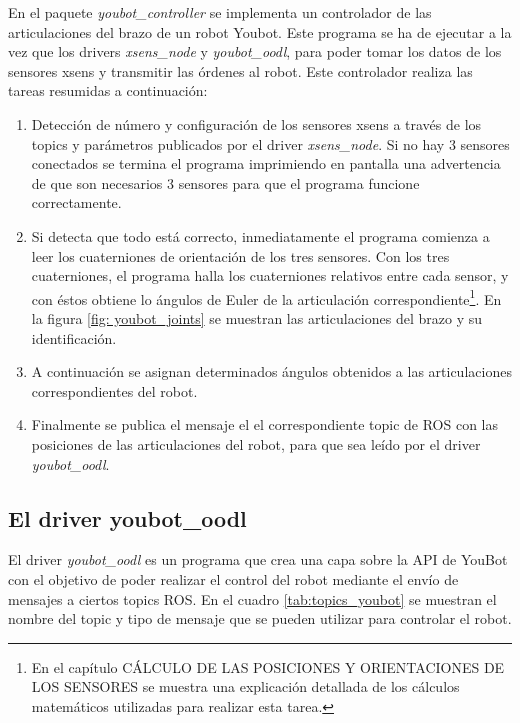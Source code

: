 \documentclass[12pt, a4paper]{report}
\begin{document}
En el paquete \textit{youbot\_controller} se implementa un controlador de las articulaciones del brazo de un robot Youbot. Este programa se ha de ejecutar a la vez que los drivers \textit{xsens\_node} y \textit{youbot\_oodl}, para poder tomar los datos de los sensores xsens y transmitir las órdenes al robot. Este controlador realiza las tareas resumidas a continuación:

\begin{enumerate}

\item Detección de número y configuración de los sensores xsens a través de los topics y parámetros publicados por el driver \textit{xsens\_node}. Si no hay 3 sensores conectados se termina el programa imprimiendo en pantalla una advertencia de que son necesarios 3 sensores para que el programa funcione correctamente.

\item Si detecta que todo está correcto, inmediatamente el programa comienza a leer los cuaterniones de orientación de los tres sensores. Con los tres cuaterniones, el programa halla los cuaterniones relativos entre cada sensor, y con éstos obtiene lo ángulos de Euler de la articulación correspondiente\footnote{En el capítulo CÁLCULO DE LAS POSICIONES Y ORIENTACIONES DE LOS SENSORES se muestra una explicación detallada de los cálculos matemáticos utilizadas para realizar esta tarea.}. En la figura \ref{fig: youbot_joints} se muestran las articulaciones del brazo y su identificación. 

\item A continuación se asignan determinados ángulos obtenidos a las articulaciones correspondientes del robot. 

\item Finalmente se publica el mensaje el el correspondiente topic de ROS con las posiciones de las articulaciones del robot, para que sea leído por el driver \textit{youbot\_oodl}.

\end{enumerate}



\subsection{El driver youbot\_oodl}

El driver \textit{youbot\_oodl} es un programa que crea una capa sobre la API de YouBot con el objetivo de poder realizar el control del robot mediante el envío de mensajes a ciertos topics ROS. En el cuadro \ref{tab:topics_youbot} se muestran el nombre del topic y tipo de mensaje que se pueden utilizar para controlar el robot.    
\end{document}
